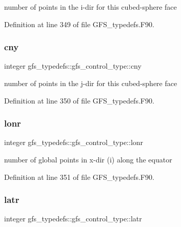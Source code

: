 number of points in the i-\/dir for this cubed-\/sphere face 



Definition at line 349 of file G\+F\+S\+\_\+typedefs.\+F90.

\mbox{\label{structgfs__typedefs_1_1gfs__control__type_a2ba0d89e86affb39c91b545109cdbb18}} 
\subsubsection{cny}
{\footnotesize\ttfamily integer gfs\+\_\+typedefs\+::gfs\+\_\+control\+\_\+type\+::cny}



number of points in the j-\/dir for this cubed-\/sphere face 



Definition at line 350 of file G\+F\+S\+\_\+typedefs.\+F90.

\mbox{\label{structgfs__typedefs_1_1gfs__control__type_adb8954fe6554146147687de3fa646db2}} 
\subsubsection{lonr}
{\footnotesize\ttfamily integer gfs\+\_\+typedefs\+::gfs\+\_\+control\+\_\+type\+::lonr}



number of global points in x-\/dir (i) along the equator 



Definition at line 351 of file G\+F\+S\+\_\+typedefs.\+F90.

\mbox{\label{structgfs__typedefs_1_1gfs__control__type_ac55a4ae35d9c30b00be1d000fd395f8a}} 
\subsubsection{latr}
{\footnotesize\ttfamily integer gfs\+\_\+typedefs\+::gfs\+\_\+control\+\_\+type\+::latr}



